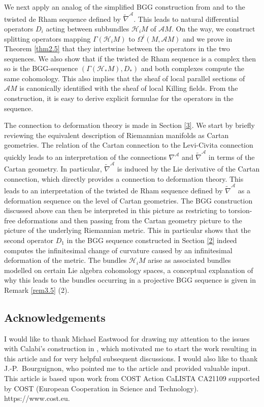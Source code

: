 \documentclass[12pt,a4paper]{amsart}
\def\Cal{\mathcal}
\newcommand{\Ga}{\Gamma}
\newcommand{\Om}{\Omega}
\numberwithin{theorem}{section}
\numberwithin{equation}{section}
\theoremstyle{definition}
\theoremstyle{remark}
\begin{document}
We next apply an analog of the simplified BGG construction from \cite{C-H:weak} and
\cite{Riem-BGG} to the twisted de Rham sequence defined by $\tilde\nabla^{\Cal
  A}$. This leads to natural differential operators $D_i$ acting between subbundles
$\Cal H_iM$ of $\Cal AM$. On the way, we construct splitting operators mapping
$\Ga(\Cal H_iM)$ to $\Om^i(M,\Cal AM)$ and we prove in Theorem \ref{thm2.5} that they
intertwine between the operators in the two sequences. We also show that if the
twisted de Rham sequence is a complex then so is the BGG-sequence $(\Ga(\Cal
H_*M),D_*)$ and both complexes compute the same cohomology. This also implies that
the sheaf of local parallel sections of $\Cal AM$ is canonically identified with the
sheaf of local Killing fields. From the construction, it is easy to derive explicit
formulae for the operators in the sequence.

The connection to deformation theory is made in Section \ref{3}. We start by briefly
reviewing the equivalent description of Riemannian manifolds as Cartan
geometries. The relation of the Cartan connection to the Levi-Civita connection
quickly leads to an interpretation of the connections $\nabla^{\Cal A}$ and
$\tilde\nabla^{\Cal A}$ in terms of the Cartan geometry. In particular,
$\tilde\nabla^{\Cal A}$ is induced by the Lie derivative of the Cartan connection,
which directly provides a connection to deformation theory. This leads to an
interpretation of the twisted de Rham sequence defined by $\tilde\nabla^{\Cal A}$ as
a deformation sequence on the level of Cartan geometries. The BGG construction
discussed above can then be interpreted in this picture as restricting to
torsion-free deformations and then passing from the Cartan geometry picture to the
picture of the underlying Riemannian metric. This in particular shows that the second
operator $D_1$ in the BGG sequence constructed in Section \ref{2} indeed computes the
infinitesimal change of curvature caused by an infinitesimal deformation of the
metric. The bundles $\Cal H_iM$ arise as associated bundles modelled on certain Lie
algebra cohomology spaces, a conceptual explanation of why this leads to the bundles
occurring in a projective BGG sequence is given in Remark \ref{rem3.5} (2).

\subsection*{Acknowledgements} I would like to thank Michael Eastwood for drawing my
attention to the issues with Calabi's construction in \cite{Calabi}, which motivated
me to start the work resulting in this article and for very helpful subsequent
discussions. I would also like to thank J.-P.\ Bourguignon, who pointed me to the
article \cite{BBL} and provided valuable input. This article is based upon work from
COST Action CaLISTA CA21109 supported by COST (European Cooperation in Science and
Technology). https://www.cost.eu.
\end{document}
